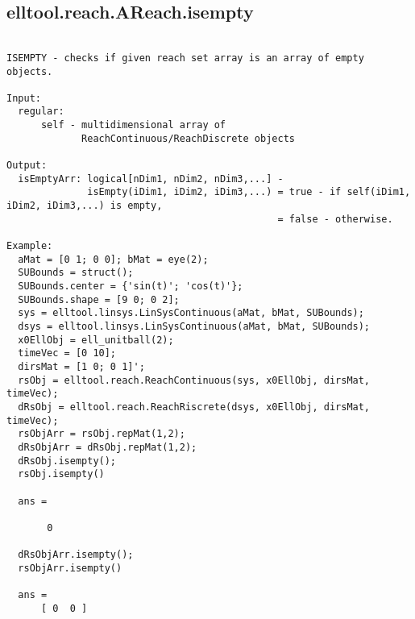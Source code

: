 \subsection{\texorpdfstring{elltool.reach.AReach.isempty}{isempty}}\label{method:elltool.reach.AReach.isempty}
\begin{verbatim}

ISEMPTY - checks if given reach set array is an array of empty objects.

Input:
  regular:
      self - multidimensional array of
             ReachContinuous/ReachDiscrete objects

Output:
  isEmptyArr: logical[nDim1, nDim2, nDim3,...] -
              isEmpty(iDim1, iDim2, iDim3,...) = true - if self(iDim1, iDim2, iDim3,...) is empty,
                                               = false - otherwise.

Example:
  aMat = [0 1; 0 0]; bMat = eye(2);
  SUBounds = struct();
  SUBounds.center = {'sin(t)'; 'cos(t)'};
  SUBounds.shape = [9 0; 0 2];
  sys = elltool.linsys.LinSysContinuous(aMat, bMat, SUBounds);
  dsys = elltool.linsys.LinSysContinuous(aMat, bMat, SUBounds);
  x0EllObj = ell_unitball(2);
  timeVec = [0 10];
  dirsMat = [1 0; 0 1]';
  rsObj = elltool.reach.ReachContinuous(sys, x0EllObj, dirsMat, timeVec);
  dRsObj = elltool.reach.ReachRiscrete(dsys, x0EllObj, dirsMat, timeVec);
  rsObjArr = rsObj.repMat(1,2);
  dRsObjArr = dRsObj.repMat(1,2);
  dRsObj.isempty();
  rsObj.isempty()

  ans =

       0

  dRsObjArr.isempty();
  rsObjArr.isempty()

  ans =
      [ 0  0 ]
\end{verbatim}
